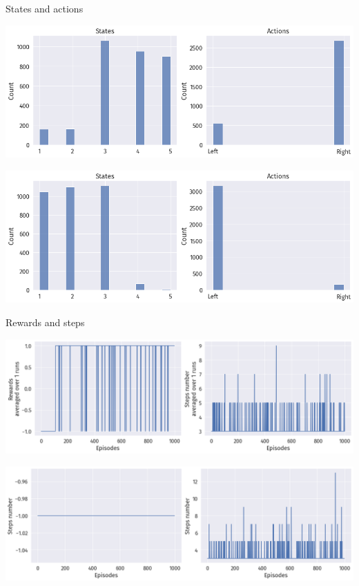 \documentclass[bigger]{beamer}
\begin{document}
\begin{frame}[label={sec:org3a04015}]{States and actions}
\begin{center}
\includegraphics[width=.9\linewidth]{img/DRL-states-actions.png}
\end{center}
\begin{center}
\includegraphics[width=.9\linewidth]{img/DRL-states-actions2.png}
\end{center}
\end{frame}
\begin{frame}[label={sec:org8eec4e0}]{Rewards and steps}
\begin{center}
\includegraphics[width=.9\linewidth]{img/DRL-rewards-steps.png}
\end{center}
\begin{center}
\includegraphics[width=.9\linewidth]{img/DRL-rewards-steps2.png}
\end{center}
\end{frame}
\end{document}
